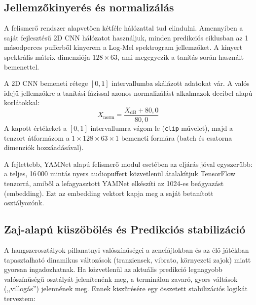 \subsection{Jellemzőkinyerés és normalizálás}

A felismerő rendszer alapvetően kétféle hálózattal tud elindulni. Amennyiben a saját fejlesztésű 2D CNN hálózatot használjuk, minden predikciós ciklusban az 1 másodperces pufferből kinyerem a Log-Mel spektrogram jellemzőket. A kinyert spektrális mátrix dimenziója $128 \times 63$, ami megegyezik a tanítás során használt bemenettel.

A 2D CNN bemeneti rétege $[0, 1]$ intervallumba skálázott adatokat vár. A valós idejű jellemzőkre a tanítási fázissal azonos normalizálást alkalmazok decibel alapú korlátokkal:
$$X_{\text{norm}} = \frac{X_{\text{dB}} + 80,0}{80,0}$$
A kapott értékeket a $[0, 1]$ intervallumra vágom le (\texttt{clip} művelet), majd a tenzort átformázom a $1 \times 128 \times 63 \times 1$ bemeneti formára (batch és csatorna dimenziók hozzáadásával).

A fejlettebb, YAMNet alapú felismerő modul esetében az eljárás jóval egyszerűbb: a teljes, 16\,000 mintás nyers audiopuffert közvetlenül átalakítjuk TensorFlow tenzorrá, amiből a lefagyasztott YAMNet elkészíti az 1024-es beágyazást (embedding). Ezt az embedding vektort kapja meg a saját betanított osztályozónk.

\subsection{Zaj-alapú küszöbölés és Predikciós stabilizáció}

A hangszerosztályok pillanatnyi valószínűségei a zenefájlokban és az élő játékban tapasztalható dinamikus változások (tranziensek, vibrato, környezeti zajok) miatt gyorsan ingadozhatnak. Ha közvetlenül az aktuális predikció legnagyobb valószínűségű osztályát jelenítenénk meg, a terminálon zavaró, gyors váltások (,,villogás'') jelennének meg. Ennek kiszűrésére egy összetett stabilizációs logikát terveztem:

